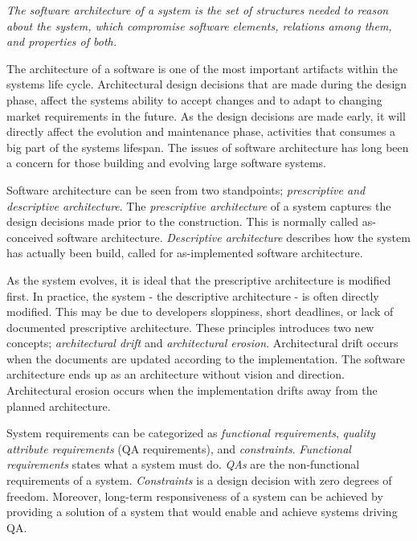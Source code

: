 {\begin{displayquote}
\textit{The software architecture of a system is the set of structures needed to reason about the system, which compromise software elements, relations among them, and properties of both.}
\end{displayquote}

The architecture of a software is one of the most important artifacts within the systems life cycle\cite{Bass:2012:SAP:2392670,knodel2006static}. Architectural design decisions that are made during the design phase, affect the systems ability to accept changes and to adapt to changing market requirements in the future. As the design decisions are made early, it will directly affect the evolution and maintenance phase\cite{Pressman:2009:SEP:1593949}, activities that consumes a big part of the systems lifespan\cite{Vliet:2008:SEP:1481475}. The issues of software architecture has long been a concern for those building and evolving large software systems\cite{perry1997state}.

Software architecture can be seen from two standpoints\cite{mooc}; \textit{prescriptive and descriptive architecture}. The \textit{prescriptive architecture} of a system captures the design decisions made prior to the construction. This is normally called as-conceived software architecture. \textit{Descriptive architecture} describes how the system has actually been build, called for as-implemented software architecture. 

As the system evolves, it is ideal that the prescriptive architecture is modified first. In practice, the system - the descriptive architecture - is often directly modified\cite{Bass:2012:SAP:2392670}. This may be due to developers sloppiness, short deadlines, or lack of documented prescriptive architecture. These principles introduces two new concepts; \textit{architectural drift} and \textit{architectural erosion}\cite{Bass:2012:SAP:2392670}. Architectural drift occurs when the documents are updated according to the implementation. The software architecture ends up as an architecture without vision and direction. Architectural erosion occurs when the implementation drifts away from the planned architecture. 

System requirements can be categorized as \textit{functional requirements}, \textit{quality attribute requirements} (QA requirements), and \textit{constraints}\cite{Bass:2012:SAP:2392670}. \textit{Functional requirements} states what a system must do. \textit{QAs} are the non-functional requirements of a system. \textit{Constraints} is a design decision with zero degrees of freedom. Moreover, long-term responsiveness of a system can be achieved by providing a solution of a system that would enable and achieve systems driving QA. 

}
